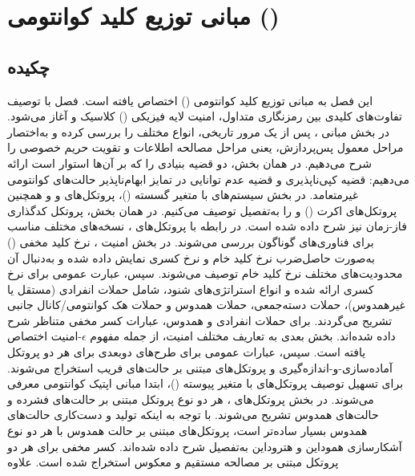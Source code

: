 
\chapter{مبانی توزیع کلید کوانتومی ()}
\label{chap:7}

\section*{چکیده}
این فصل به مبانی توزیع کلید کوانتومی () اختصاص یافته است. فصل با توصیف تفاوت‌های کلیدی بین رمزنگاری متداول، امنیت لایه فیزیکی () کلاسیک و  آغاز می‌شود. در بخش مبانی ، پس از یک مرور تاریخی، انواع مختلف  را بررسی کرده و به‌اختصار مراحل معمول پس‌پردازش، یعنی مراحل مصالحه اطلاعات و تقویت حریم خصوصی را شرح می‌دهیم. در همان بخش، دو قضیه بنیادی را که  بر آن‌ها استوار است ارائه می‌دهیم: قضیه کپی‌ناپذیری و قضیه عدم توانایی در تمایز ابهام‌ناپذیر حالت‌های کوانتومی غیرمتعامد. در بخش سیستم‌های  با متغیر گسسته ()، پروتکل‌های  و  و همچنین پروتکل‌های اکرت () و  را به‌تفصیل توصیف می‌کنیم. در همان بخش، پروتکل کدگذاری فاز-زمان نیز شرح داده شده است. در رابطه با پروتکل‌های ، نسخه‌های مختلف مناسب برای فناوری‌های گوناگون بررسی می‌شوند. در بخش امنیت ، نرخ کلید مخفی () به‌صورت حاصل‌ضرب نرخ کلید خام و نرخ کسری نمایش داده شده و به‌دنبال آن محدودیت‌های مختلف نرخ کلید خام توصیف می‌شوند. سپس، عبارت عمومی برای نرخ کسری ارائه شده و انواع استراتژی‌های شنود، شامل حملات انفرادی (مستقل یا غیرهمدوس)، حملات دسته‌جمعی، حملات همدوس و حملات هک کوانتومی/کانال جانبی تشریح می‌گردند. برای حملات انفرادی و همدوس، عبارات کسر مخفی متناظر شرح داده شده‌اند. بخش بعدی به تعاریف مختلف امنیت، از جمله مفهوم $\epsilon$-امنیت اختصاص یافته است. سپس، عبارات عمومی برای طرح‌های  دوبعدی برای هر دو پروتکل آماده‌سازی-و-اندازه‌گیری و پروتکل‌های مبتنی بر حالت‌های فریب استخراج می‌شوند. برای تسهیل توصیف پروتکل‌های  با متغیر پیوسته ()، ابتدا مبانی اپتیک کوانتومی معرفی می‌شوند. در بخش پروتکل‌های ، هر دو نوع پروتکل مبتنی بر حالت‌های فشرده و حالت‌های همدوس تشریح می‌شوند. با توجه به اینکه تولید و دست‌کاری حالت‌های همدوس بسیار ساده‌تر است، پروتکل‌های مبتنی بر حالت همدوس با هر دو نوع آشکارسازی هموداین و هتروداین به‌تفصیل شرح داده شده‌اند. کسر مخفی برای هر دو پروتکل  مبتنی بر مصالحه مستقیم و معکوس استخراج شده است. علاوه 